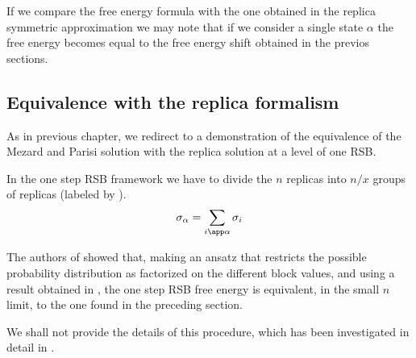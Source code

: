 If we compare the free energy formula with the one obtained in the replica symmetric approximation we may note that if we consider a single state $\alpha$ the free energy becomes equal to the free energy shift obtained in the previos sections.

\subsection{Equivalence with the replica formalism}

As in previous chapter, we redirect to a demonstration of the equivalence of the Mezard and Parisi solution with the replica solution at a level of one RSB.

In the one step RSB framework we have to divide the $n$ replicas into $n/x$ groups of replicas (labeled by \alpha).
\begin{equation}
\sigma_\alpha = \sum_{i \app \alpha} \sigma_i
\end{equation}

The authors of \cite{bethe} showed that, making an ansatz that restricts the possible probability distribution as factorized on the different block values, and using a result obtained in \cite{wong}, the one step RSB free energy is equivalent, in the small $n$ limit, to the one found in the preceding section.

We shall not provide the details of this procedure, which has been investigated in detail in \cite{bethe}.


